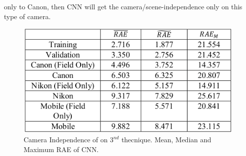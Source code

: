 \begin{enumerate}
    only to Canon, then CNN will get the camera/scene-independence 
    only on this type of camera.
    \begin{figure}[h!]
        \centering
        \includegraphics[width = 0.6 \linewidth]{images/paper4/CNNtec3.png}
        \centering
        \caption{Camera Independence of \cite{0807099122} on $ 3^{nd} $ thecnique. Mean, Median and Maximum RAE of CNN.}
        \label{fig:CNNtec2}
    \end{figure}
\end{enumerate}

